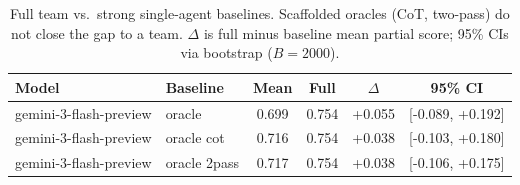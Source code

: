 \begin{table}[h]\centering\small
\caption{Full team vs.\ strong single-agent baselines. Scaffolded oracles (CoT, two-pass) do not close the gap to a team. $\Delta$ is full minus baseline mean partial score; 95\% CIs via bootstrap ($B=2000$).}
\label{tab:strong_baseline}
\begin{tabular}{llcccc}\toprule
Model & Baseline & Mean & Full & $\Delta$ & 95\% CI \\ \midrule
gemini-3-flash-preview & oracle & 0.699 & 0.754 & +0.055 & [-0.089, +0.192] \\
gemini-3-flash-preview & oracle cot & 0.716 & 0.754 & +0.038 & [-0.103, +0.180] \\
gemini-3-flash-preview & oracle 2pass & 0.717 & 0.754 & +0.038 & [-0.106, +0.175] \\
\bottomrule\end{tabular}\end{table}